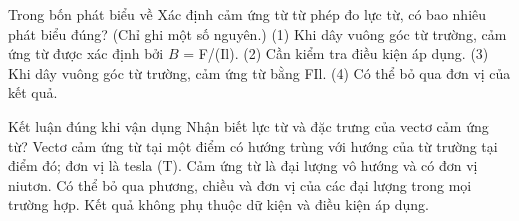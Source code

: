\begin{ex}
Trong bốn phát biểu về Xác định cảm ứng từ từ phép đo lực từ, có bao nhiêu phát biểu đúng? (Chỉ ghi một số nguyên.) (1) Khi dây vuông góc từ trường, cảm ứng từ được xác định bởi $B$ = F/(Il). (2) Cần kiểm tra điều kiện áp dụng. (3) Khi dây vuông góc từ trường, cảm ứng từ bằng FIl. (4) Có thể bỏ qua đơn vị của kết quả.
\end{ex}

\begin{ex}
Kết luận đúng khi vận dụng Nhận biết lực từ và đặc trưng của vectơ cảm ứng từ?
\choice
{\True Vectơ cảm ứng từ tại một điểm có hướng trùng với hướng của từ trường tại điểm đó; đơn vị là tesla (T).}
{Cảm ứng từ là đại lượng vô hướng và có đơn vị niutơn.}
{Có thể bỏ qua phương, chiều và đơn vị của các đại lượng trong mọi trường hợp.}
{Kết quả không phụ thuộc dữ kiện và điều kiện áp dụng.}
\end{ex}

